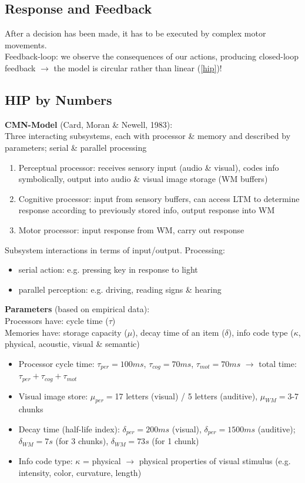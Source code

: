 \subsection{Response and Feedback}
After a decision has been made, it has to be executed by complex motor movements.\\
Feedback-loop: we observe the consequences of our actions, producing closed-loop feedback $\rightarrow$ the model is circular rather than linear (\autoref{hip})!

\subsection{HIP by Numbers}
\textbf{CMN-Model} (Card, Moran \& Newell, 1983):\\
Three interacting subsystems, each with processor \& memory and described by parameters; serial \& parallel processing
\begin{enumerate}
\item Perceptual processor: receives sensory input (audio \& visual), codes info symbolically, output into audio \& visual image storage (WM buffers)
\item Cognitive processor: input from sensory buffers, can access LTM to determine response according to previously stored info, output response into WM
\item Motor processor: input response from WM, carry out response
\end{enumerate}
Subsystem interactions in terms of input/output. Processing:
\begin{itemize}
\item serial action: e.g. pressing key in response to light
\item parallel perception: e.g. driving, reading signs \& hearing
\end{itemize}
\textbf{Parameters} (based on empirical data):\\
Processors have: cycle time ($\tau$)\\
Memories have: storage capacity ($\mu$), decay time of an item ($\delta$), info code type ($\kappa$, physical, acoustic, visual \& semantic)
\begin{itemize}
\item Processor cycle time: $\tau_{per} = 100ms$, $\tau_{cog} = 70ms$, $\tau_{mot} = 70ms$ $\rightarrow$ total time: $\tau_{per} + \tau_{cog} + \tau_{mot}$
\item Visual image store:  $\mu_{per} =$17 letters (visual) / 5 letters (auditive), $\mu_{WM} =$3-7 chunks
\item Decay time (half-life index): $\delta_{per}=200ms$ (visual), $\delta_{per}=1500ms$ (auditive); $\delta_{WM}=7s$ (for 3 chunks), $\delta_{WM}=73s$ (for 1 chunk) 
\item Info code type: $\kappa$ = physical $\rightarrow$ physical properties of visual stimulus (e.g. intensity, color, curvature, length)
\end{itemize}
